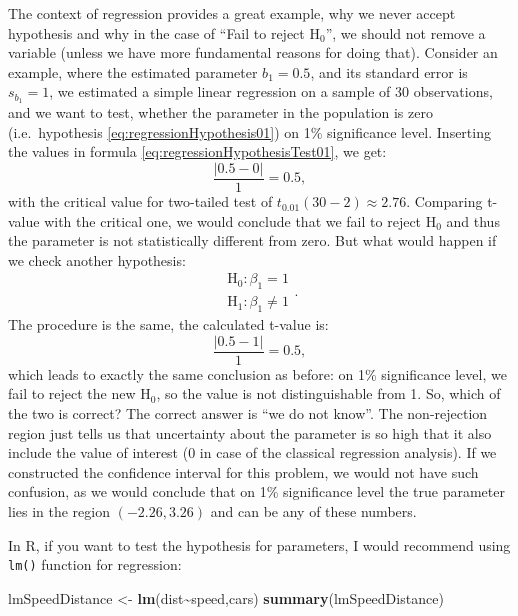 \documentclass[
]{book}
\newenvironment{Shaded}{\begin{snugshade}}{\end{snugshade}}
\newcommand{\FunctionTok}[1]{\textcolor[rgb]{0.13,0.29,0.53}{\textbf{#1}}}
\newcommand{\NormalTok}[1]{#1}
\newcommand{\OtherTok}[1]{\textcolor[rgb]{0.56,0.35,0.01}{#1}}
\newcommand{\SpecialCharTok}[1]{\textcolor[rgb]{0.81,0.36,0.00}{\textbf{#1}}}
\theoremstyle{definition}
\theoremstyle{definition}
\theoremstyle{definition}
\theoremstyle{definition}
\theoremstyle{remark}
\begin{document}
The context of regression provides a great example, why we never accept hypothesis and why in the case of ``Fail to reject H\(_0\)'', we should not remove a variable (unless we have more fundamental reasons for doing that). Consider an example, where the estimated parameter \(b_1=0.5\), and its standard error is \(s_{b_1}=1\), we estimated a simple linear regression on a sample of 30 observations, and we want to test, whether the parameter in the population is zero (i.e.~hypothesis \eqref{eq:regressionHypothesis01}) on 1\% significance level. Inserting the values in formula \eqref{eq:regressionHypothesisTest01}, we get:
\begin{equation*}
    \frac{|0.5 - 0|}{1} = 0.5,
\end{equation*}
with the critical value for two-tailed test of \(t_{0.01}(30-2)\approx 2.76\). Comparing t-value with the critical one, we would conclude that we fail to reject H\(_0\) and thus the parameter is not statistically different from zero. But what would happen if we check another hypothesis:
\begin{equation*}
    \begin{aligned}
        \mathrm{H}_0: \beta_1 = 1 \\
        \mathrm{H}_1: \beta_1 \neq 1
    \end{aligned} .
\end{equation*}
The procedure is the same, the calculated t-value is:
\begin{equation*}
    \frac{|0.5 - 1|}{1} = 0.5,
\end{equation*}
which leads to exactly the same conclusion as before: on 1\% significance level, we fail to reject the new H\(_0\), so the value is not distinguishable from 1. So, which of the two is correct? The correct answer is ``we do not know''. The non-rejection region just tells us that uncertainty about the parameter is so high that it also include the value of interest (0 in case of the classical regression analysis). If we constructed the confidence interval for this problem, we would not have such confusion, as we would conclude that on 1\% significance level the true parameter lies in the region \((-2.26, 3.26)\) and can be any of these numbers.

In R, if you want to test the hypothesis for parameters, I would recommend using \texttt{lm()} function for regression:

\begin{Shaded}
\begin{Highlighting}[]
\NormalTok{lmSpeedDistance }\OtherTok{\textless{}{-}} \FunctionTok{lm}\NormalTok{(dist}\SpecialCharTok{\textasciitilde{}}\NormalTok{speed,cars)}
\FunctionTok{summary}\NormalTok{(lmSpeedDistance)}
\end{Highlighting}
\end{Shaded}
\end{document}
